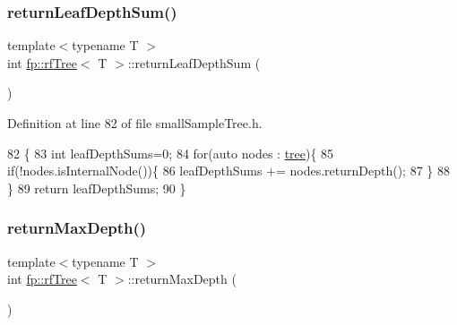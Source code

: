 \subsubsection{\texorpdfstring{return\+Leaf\+Depth\+Sum()}{returnLeafDepthSum()}\hspace{0.1cm}{\footnotesize\ttfamily [2/2]}}
{\footnotesize\ttfamily template$<$typename T $>$ \\
int \hyperlink{classfp_1_1rfTree}{fp\+::rf\+Tree}$<$ T $>$\+::return\+Leaf\+Depth\+Sum (\begin{DoxyParamCaption}{ }\end{DoxyParamCaption})\hspace{0.3cm}{\ttfamily [inline]}}



Definition at line 82 of file small\+Sample\+Tree.\+h.


\begin{DoxyCode}
82                                                \{
83                     \textcolor{keywordtype}{int} leafDepthSums=0;
84                     \textcolor{keywordflow}{for}(\textcolor{keyword}{auto} nodes : \hyperlink{classtree}{tree})\{
85                         \textcolor{keywordflow}{if}(!nodes.isInternalNode())\{
86                             leafDepthSums += nodes.returnDepth();
87                         \}
88                     \}
89                     \textcolor{keywordflow}{return} leafDepthSums;
90                 \}
\end{DoxyCode}
\mbox{\label{classfp_1_1rfTree_ab439134c1e24059fe74f84ac8eff78dd}} 
\subsubsection{\texorpdfstring{return\+Max\+Depth()}{returnMaxDepth()}\hspace{0.1cm}{\footnotesize\ttfamily [1/2]}}
{\footnotesize\ttfamily template$<$typename T $>$ \\
int \hyperlink{classfp_1_1rfTree}{fp\+::rf\+Tree}$<$ T $>$\+::return\+Max\+Depth (\begin{DoxyParamCaption}{ }\end{DoxyParamCaption})\hspace{0.3cm}{\ttfamily [inline]}}



